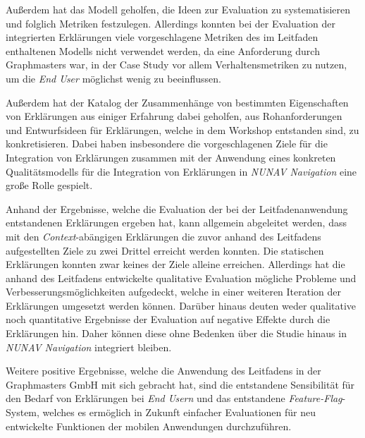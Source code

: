 Außerdem hat das Modell geholfen, die Ideen zur Evaluation zu systematisieren und folglich Metriken festzulegen. Allerdings konnten bei der Evaluation der integrierten Erklärungen viele vorgeschlagene Metriken des im Leitfaden enthaltenen Modells nicht verwendet werden, da eine Anforderung durch Graphmasters war, in der Case Study vor allem Verhaltensmetriken zu nutzen, um die \textit{End User} möglichst wenig zu beeinflussen.

Außerdem hat der Katalog der Zusammenhänge von bestimmten Eigenschaften von Erklärungen aus einiger Erfahrung dabei geholfen, aus Rohanforderungen und Entwurfsideen für Erklärungen, welche in dem Workshop entstanden sind, zu konkretisieren. Dabei haben insbesondere die vorgeschlagenen Ziele für die Integration von Erklärungen zusammen mit der Anwendung eines konkreten Qualitätsmodells für die Integration von Erklärungen in \textit{NUNAV Navigation} eine große Rolle gespielt.

Anhand der Ergebnisse, welche die Evaluation der bei der Leitfadenanwendung entstandenen Erklärungen ergeben hat, kann allgemein abgeleitet werden, dass mit den \textit{Context}-abängigen Erklärungen die zuvor anhand des Leitfadens aufgestellten Ziele zu zwei Drittel erreicht werden konnten. Die statischen Erklärungen konnten zwar keines der Ziele alleine erreichen. Allerdings hat die anhand des Leitfadens entwickelte qualitative Evaluation mögliche Probleme und Verbesserungsmöglichkeiten aufgedeckt, welche in einer weiteren Iteration der Erklärungen umgesetzt werden können. Darüber hinaus deuten weder qualitative noch quantitative Ergebnisse der Evaluation auf negative Effekte durch die Erklärungen hin. Daher können diese ohne Bedenken über die Studie hinaus in \textit{NUNAV Navigation} integriert bleiben.

Weitere positive Ergebnisse, welche die Anwendung des Leitfadens in der Graphmasters GmbH mit sich gebracht hat, sind die entstandene Sensibilität für den Bedarf von Erklärungen bei \textit{End Usern} und das entstandene \textit{Feature-Flag}-System, welches es ermöglich in Zukunft einfacher Evaluationen für neu entwickelte Funktionen der mobilen Anwendungen durchzuführen.